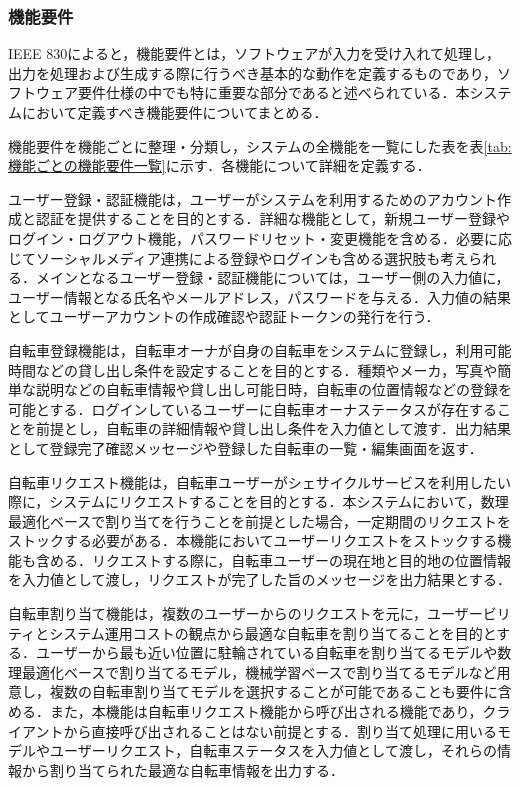       \subsubsection{機能要件}
        \label{sec:機能要件}
          \par IEEE 830\cite{392555}によると，機能要件とは，ソフトウェアが入力を受け入れて処理し，出力を処理および生成する際に行うべき基本的な動作を定義するものであり，ソフトウェア要件仕様の中でも特に重要な部分であると述べられている．本システムにおいて定義すべき機能要件についてまとめる．
          \par 機能要件を機能ごとに整理・分類し，システムの全機能を一覧にした表を表\ref{tab:機能ごとの機能要件一覧}に示す．各機能について詳細を定義する．
          \par ユーザー登録・認証機能は，ユーザーがシステムを利用するためのアカウント作成と認証を提供することを目的とする．詳細な機能として，新規ユーザー登録やログイン・ログアウト機能，パスワードリセット・変更機能を含める．必要に応じてソーシャルメディア連携による登録やログインも含める選択肢も考えられる．メインとなるユーザー登録・認証機能については，ユーザー側の入力値に，ユーザー情報となる氏名やメールアドレス，パスワードを与える．入力値の結果としてユーザーアカウントの作成確認や認証トークンの発行を行う．
          \par 自転車登録機能は，自転車オーナが自身の自転車をシステムに登録し，利用可能時間などの貸し出し条件を設定することを目的とする．種類やメーカ，写真や簡単な説明などの自転車情報や貸し出し可能日時，自転車の位置情報などの登録を可能とする．ログインしているユーザーに自転車オーナステータスが存在することを前提とし，自転車の詳細情報や貸し出し条件を入力値として渡す．出力結果として登録完了確認メッセージや登録した自転車の一覧・編集画面を返す．
          \par 自転車リクエスト機能は，自転車ユーザーがシェサイクルサービスを利用したい際に，システムにリクエストすることを目的とする．本システムにおいて，数理最適化ベースで割り当てを行うことを前提とした場合，一定期間のリクエストをストックする必要がある．本機能においてユーザーリクエストをストックする機能も含める．リクエストする際に，自転車ユーザーの現在地と目的地の位置情報を入力値として渡し，リクエストが完了した旨のメッセージを出力結果とする．
          \par 自転車割り当て機能は，複数のユーザーからのリクエストを元に，ユーザービリティとシステム運用コストの観点から最適な自転車を割り当てることを目的とする．ユーザーから最も近い位置に駐輪されている自転車を割り当てるモデルや数理最適化ベースで割り当てるモデル，機械学習ベースで割り当てるモデルなど用意し，複数の自転車割り当てモデルを選択することが可能であることも要件に含める．また，本機能は自転車リクエスト機能から呼び出される機能であり，クライアントから直接呼び出されることはない前提とする．割り当て処理に用いるモデルやユーザーリクエスト，自転車ステータスを入力値として渡し，それらの情報から割り当てられた最適な自転車情報を出力する．
